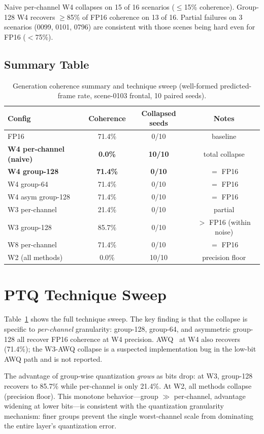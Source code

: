 \documentclass[conference]{IEEEtran}
\begin{document}
Naive per-channel W4 collapses on 15 of 16 scenarios ($\leq$15\% coherence). Group-128 W4
recovers $\geq$85\% of FP16 coherence on 13 of 16. Partial failures on 3 scenarios (0099,
0101, 0796) are consistent with those scenes being hard even for FP16 ($<$75\%).

\subsection{Summary Table}

\begin{table}[t]\centering
\caption{Generation coherence summary and technique sweep (well-formed predicted-frame rate,
scene-0103 frontal, 10 paired seeds).}
\label{tab:summary}
\begin{tabular}{lccc}
\toprule
Config & Coherence & Collapsed seeds & Notes \\
\midrule
FP16 & 71.4\% & 0/10 & baseline \\
\textbf{W4 per-channel (naive)} & \textbf{0.0\%} & \textbf{10/10} & total collapse \\
\textbf{W4 group-128} & \textbf{71.4\%} & \textbf{0/10} & $=$ FP16 \\
W4 group-64 & 71.4\% & 0/10 & $=$ FP16 \\
W4 asym group-128 & 71.4\% & 0/10 & $=$ FP16 \\
W3 per-channel & 21.4\% & 0/10 & partial \\
W3 group-128 & 85.7\% & 0/10 & $>$ FP16 (within noise) \\
W8 per-channel & 71.4\% & 0/10 & $=$ FP16 \\
W2 (all methods) & 0.0\% & 10/10 & precision floor \\
\bottomrule
\end{tabular}
\end{table}

\section{PTQ Technique Sweep}
\label{sec:sweep}

Table~\ref{tab:summary} shows the full technique sweep. The key finding is that the collapse
is specific to \emph{per-channel} granularity: group-128, group-64, and asymmetric group-128 all
recover FP16 coherence at W4 precision. AWQ~\cite{awq} at W4 also recovers (71.4\%); the W3-AWQ
collapse is a suspected implementation bug in the low-bit AWQ path and is not reported.

The advantage of group-wise quantization \emph{grows} as bits drop: at W3, group-128 recovers
to 85.7\% while per-channel is only 21.4\%. At W2, all methods collapse (precision floor). This
monotone behavior---group $\gg$ per-channel, advantage widening at lower bits---is consistent
with the quantization granularity mechanism: finer groups prevent the single worst-channel scale
from dominating the entire layer's quantization error.
\end{document}
